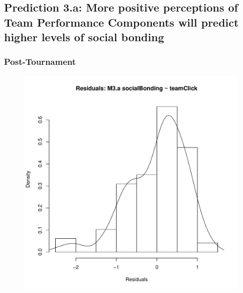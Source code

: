 {      \subsection{Prediction 3.a: More positive perceptions of Team Performance Components will predict higher levels of social bonding}

      \subsubsection{Post-Tournament}

          


      \begin{figure}[htbp]
        \includegraphics[scale =.4]{images/MLM3aHist.pdf}

\end{figure}}
